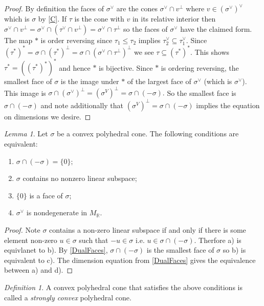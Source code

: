 \documentclass[BSc]{usydthesis}
\numberwithin{equation}{chapter}
\theoremstyle{remark}
\newtheorem{Definition}[equation]{Definition}
\newtheorem{Lemma}[equation]{Lemma}
\newcommand{\R}{\mathbb{R}}
\newcommand{\V}{\vee}
\begin{document}
\begin{proof}
 By definition the faces of $\sigma^{\V}$ are the cones $\sigma^{\V} \cap v^{\perp}$ where $v\in (\sigma^{\V})^{\V}$ which is $\sigma$ by \ref{C}. If $\tau$ is the cone with $v$ in its relative interior then $\sigma^{\V}\cap v^{\perp} = \sigma^{\V} \cap ( \tau^{\V}\cap v^{\perp}) = \sigma^{\V} \cap \tau^{\perp}$ so the faces of $\sigma^{\V}$ have the claimed form. The map $*$ is order reversing since $\tau_1\leq \tau_2$ implies $\tau_2^{\V} \subseteq \tau_1^{\V}.$ Since $(\tau^*)^*= \sigma \cap (\tau^*)^{\perp} = \sigma \cap (\sigma^{\V} \cap \tau^{\perp})^{\perp}$ we see $\tau \subseteq (\tau^*)^*.$ This shows $\tau^* =  ( (\tau^*)^*)^*$ and hence $*$ is bijective. Since $*$ is ordering reversing, the smallest face of $\sigma$ is the image under $*$ of the largest face of $\sigma^{\V}$ (which is $\sigma^{\V}$). This image is $ \sigma \cap (\sigma^{\V})^{\perp} = (\sigma^{V})^{\perp}= \sigma \cap (-\sigma).$ So the smallest face is $\sigma \cap (-\sigma)$ and note additionally that $(\sigma^{V})^{\perp}= \sigma \cap (-\sigma)$ implies the equation on dimensions we desire.
\end{proof}



\begin{Lemma}\label{strongzero} Let $\sigma$ be a convex polyhedral cone. The following conditions are equivalent: 

\begin{enumerate}
	\item $\sigma \cap (-\sigma) = \{ 0\};$
	\item $\sigma$ contains no nonzero linear subspace;
	\item $\{0\}$ is a face of $\sigma;$
	\item $\sigma^{\V}$ is nondegenerate in $M_{\R}.$
\end{enumerate}
\end{Lemma}

\begin{proof}
 Note $\sigma$ contains a non-zero linear subspace if and only if there is some element non-zero $u\in \sigma$ such that $-u\in \sigma$ i.e. $u\in \sigma \cap (-\sigma).$ Therfore a) is equivlanet to b). By \ref{DualFaces}, $\sigma \cap (-\sigma)$ is the smallest face of $\sigma$ so b) is equivalent to c). The dimension equation from \ref{DualFaces} gives the equivalence between a) and d).  
\end{proof}

\begin{Definition}
A convex polyhedral cone that satisfies the above conditions is called a {\em strongly convex} polyhedral cone. 
\end{Definition}
\end{document}
